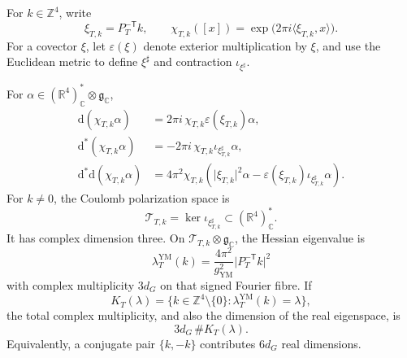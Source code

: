 For \(k\in\mathbb Z^4\), write
\[
 \xi_{T,k}=P_T^{-\mathsf T}k,\qquad
 \chi_{T,k}([x])
 =\exp\bigl(2\pi i\langle\xi_{T,k},x\rangle\bigr).
\]
For a covector \(\xi\), let \(\varepsilon(\xi)\) denote exterior
multiplication by \(\xi\), and use the Euclidean metric to define
\(\xi^\sharp\) and contraction \(\iota_{\xi^\sharp}\).

\begin{proposition}
\label{cusp-gauge-continuum-symbol}
For
\(\alpha\in(\mathbb R^4)^*_{\mathbb C}\otimes\mathfrak g_{\mathbb C}\),
\begin{align}
 \mathrm d(\chi_{T,k}\alpha)
 &=2\pi i\,\chi_{T,k}\varepsilon(\xi_{T,k})\alpha,
 \label{cusp-gauge-continuum-d-symbol}\\
 \mathrm d^*(\chi_{T,k}\alpha)
 &=-2\pi i\,\chi_{T,k}\iota_{\xi_{T,k}^\sharp}\alpha,
 \label{cusp-gauge-continuum-dstar-symbol}\\
 \mathrm d^*\mathrm d(\chi_{T,k}\alpha)
 &=4\pi^2\chi_{T,k}
 \left(
  \lvert\xi_{T,k}\rvert^2\alpha
  -\varepsilon(\xi_{T,k})
   \iota_{\xi_{T,k}^\sharp}\alpha
 \right).
 \label{cusp-gauge-continuum-dstard-symbol}
\end{align}
For \(k\ne0\), the Coulomb polarization space is
\begin{equation}
 \mathcal T_{T,k}
 =\ker\iota_{\xi_{T,k}^\sharp}
 \subset(\mathbb R^4)^*_{\mathbb C}.
 \label{cusp-gauge-continuum-transverse-space}
\end{equation}
It has complex dimension three.  On
\(\mathcal T_{T,k}\otimes\mathfrak g_{\mathbb C}\), the Hessian
eigenvalue is
\begin{equation}
 \lambda_T^{\mathrm{YM}}(k)
 =\frac{4\pi^2}{g_{\mathrm{YM}}^2}
 \lvert P_T^{-\mathsf T}k\rvert^2
 \label{cusp-gauge-continuum-mode-eigenvalue}
\end{equation}
with complex multiplicity \(3d_G\) on that signed Fourier fibre.  If
\[
 K_T(\lambda)
 =\{k\in\mathbb Z^4\setminus\{0\}:
       \lambda_T^{\mathrm{YM}}(k)=\lambda\},
\]
the total complex multiplicity, and also the dimension of the real
eigenspace, is
\begin{equation}
 3d_G\,\#K_T(\lambda).
 \label{cusp-gauge-continuum-shell-multiplicity}
\end{equation}
Equivalently, a conjugate pair \(\{k,-k\}\) contributes \(6d_G\) real
dimensions.
\end{proposition}

